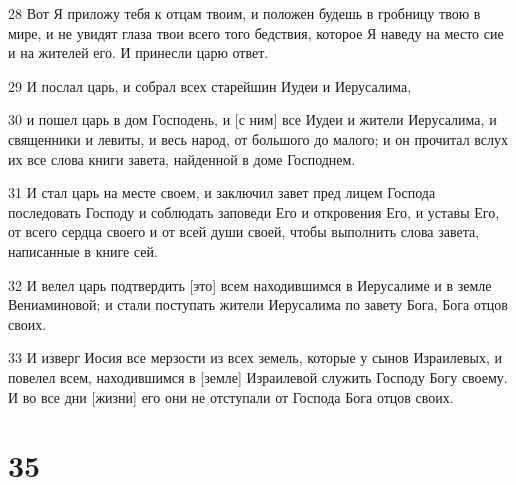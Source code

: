 \par 28 Вот Я приложу тебя к отцам твоим, и положен будешь в гробницу твою в мире, и не увидят глаза твои всего того бедствия, которое Я наведу на место сие и на жителей его. И принесли царю ответ.
\par 29 И послал царь, и собрал всех старейшин Иудеи и Иерусалима,
\par 30 и пошел царь в дом Господень, и [с ним] все Иудеи и жители Иерусалима, и священники и левиты, и весь народ, от большого до малого; и он прочитал вслух их все слова книги завета, найденной в доме Господнем.
\par 31 И стал царь на месте своем, и заключил завет пред лицем Господа последовать Господу и соблюдать заповеди Его и откровения Его, и уставы Его, от всего сердца своего и от всей души своей, чтобы выполнить слова завета, написанные в книге сей.
\par 32 И велел царь подтвердить [это] всем находившимся в Иерусалиме и в земле Вениаминовой; и стали поступать жители Иерусалима по завету Бога, Бога отцов своих.
\par 33 И изверг Иосия все мерзости из всех земель, которые у сынов Израилевых, и повелел всем, находившимся в [земле] Израилевой служить Господу Богу своему. И во все дни [жизни] его они не отступали от Господа Бога отцов своих.

\chapter{35}

